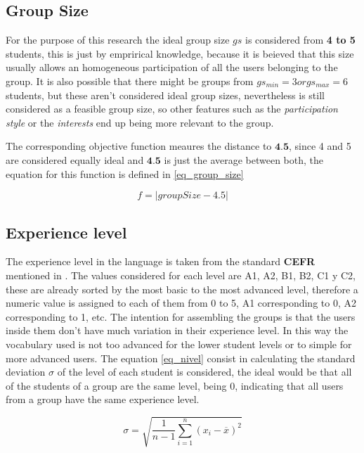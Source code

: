 \subsection{Group Size}

For the purpose of this research the ideal group size $gs$ is considered from \textbf{4 to 5} students, this is just by emprirical knowledge, because it is beieved that this size usually allows an homogeneous participation of all the users belonging to the group. It is also possible that there might be groups from  \textbf{$gs_{min} = 3 or gs_{max} = 6$} students, but these aren't considered ideal group sizes, nevertheless is still considered as a feasible group size, so other features such as the \textit{participation style} or the \textit{interests} end up being more relevant to the group.

The corresponding objective function meaures the distance to $\textbf{4.5}$, since 4 and 5 are considered equally ideal and $\textbf{4.5}$ is just the average between both, the equation for this function is defined in \ref{eq_group_size}

\begin{equation} \label{eq_group_size}
    f = | groupSize - 4.5|
\end{equation}

\subsection{Experience level}

The experience level in the language is taken from the standard \textbf{CEFR} mentioned in \cite{chapter:chapter02}. The values considered for each level are A1, A2, B1, B2, C1 y C2, these are already sorted by the most basic to the most advanced level, therefore a numeric value is assigned to each of them from 0 to 5, A1 corresponding to 0, A2 corresponding to 1, etc. The intention for assembling the groups is that the users inside them don't have much variation in their experience level. In this way the vocabulary used is not too advanced for the lower student levels or to simple for more advanced users. The equation \ref{eq_nivel} consist in calculating the standard deviation $\sigma$ of the level of each student is considered, the ideal would be that all of the students of a group are the same level, being 0, indicating that all users from a group have the same experience level.

\begin{equation} \label{eq_nivel}
    \sigma = \sqrt{\frac{1}{n-1} \sum_{i=1}^n (x_i - \overline{x})^2}
\end{equation}

